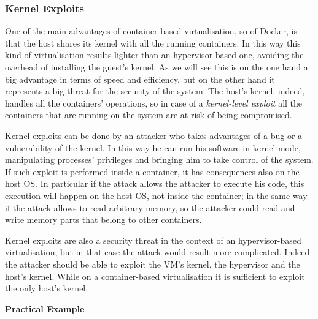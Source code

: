 \documentclass[a4paper,12pt]{article}
\begin{document}
\subsubsection{Kernel Exploits}

One of the main advantages of container-based virtualisation, so of Docker,
is that the host shares its kernel with all the running containers. In this way
this kind of virtualisation results lighter than an hypervisor-based one,
avoiding the overhead of installing the guest's kernel. As we will see this is
on the one hand a big advantage in terms of speed and efficiency, but on the
other hand it represents a big threat for the security of the system. The host's
kernel, indeed, handles all the containers' operations, so in case of a
\textit{kernel-level exploit} all the containers that are running on the system
are at risk of being compromised.\par Kernel exploits can be done by an attacker
who takes advantages of a bug or a vulnerability of the kernel. In this way he
can run his software in kernel mode, manipulating processes' privileges and
bringing him to take control of the system. If such exploit is performed inside
a container, it has consequences also on the host OS. In particular if the
attack allows the attacker to execute his code, this execution will happen on
the host OS, not inside the container; in the same way if the attack allows to
read arbitrary memory, so the attacker could read and write memory parts that
belong to other containers.\par Kernel exploits are also a security threat in
the context of an hypervisor-based virtualisation, but in that case the attack
would result more complicated. Indeed the attacker should be able to exploit the
VM's kernel, the hypervisor and the host's kernel. While on a container-based
virtualisation it is sufficient to exploit the only host's kernel.

\bigbreak\textbf{Practical Example}\bigbreak 
\end{document}

